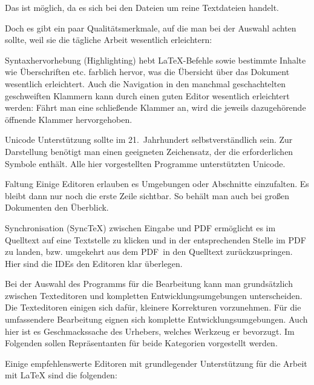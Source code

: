 
Das ist möglich, da es sich bei den Dateien um reine Textdateien handelt.

Doch es gibt ein paar Qualitätsmerkmale, auf die man bei der Auswahl achten sollte, weil
sie die tägliche Arbeit wesentlich erleichtern:

\begin{labeling}{}

\item[Syntaxhervorhebung] (Highlighting) hebt \LaTeX-Befehle sowie bestimmte
  Inhalte wie Überschriften etc. farblich hervor, was die Übersicht über das
  Dokument wesentlich erleichtert. Auch die Navigation in den manchmal
  geschachtelten geschweiften Klammern kann durch einen guten Editor
  wesentlich erleichtert werden: Fährt man eine schließende Klammer an, wird
  die jeweils dazugehörende öffnende Klammer hervorgehoben.

\item [Unicode Unterstützung] sollte im 21.\ Jahrhundert selbstverständlich
  sein.  Zur Darstellung benötigt man einen geeigneten Zeichensatz, der die
  erforderlichen Symbole enthält. Alle hier vorgestellten Programme
  unterstützten Unicode.

\item [Faltung] Einige Editoren erlauben es Umgebungen oder Abschnitte
  einzufalten.  Es bleibt dann nur noch die erste Zeile sichtbar. So behält
  man auch bei großen Dokumenten den Überblick.

\item [Synchronisation] (SyncTeX) zwischen Eingabe und PDF ermöglicht es im
  Quelltext auf eine Textstelle zu klicken und in der entsprechenden Stelle
  im PDF zu landen, bzw.  umgekehrt aus dem PDF in den Quelltext
  zurückzuspringen. Hier sind die IDEs den Editoren klar überlegen.

\end{labeling}

Bei der Auswahl des Programms für die Bearbeitung kann man grundsätzlich zwischen Texteditoren und kompletten Entwicklungsumgebungen unterscheiden.
Die Texteditoren einigen sich dafür, kleinere Korrekturen vorzunehmen.
Für die umfassendere Bearbeitung eignen sich komplette Entwicklungsumgebungen.
Auch hier ist es Geschmackssache des Urhebers, welches Werkzeug er bevorzugt.
Im Folgenden sollen Repräsentanten für beide Kategorien vorgestellt werden.

Einige empfehlenswerte Editoren mit grundlegender Unterstützung für die Arbeit mit \LaTeX{} sind die folgenden:

